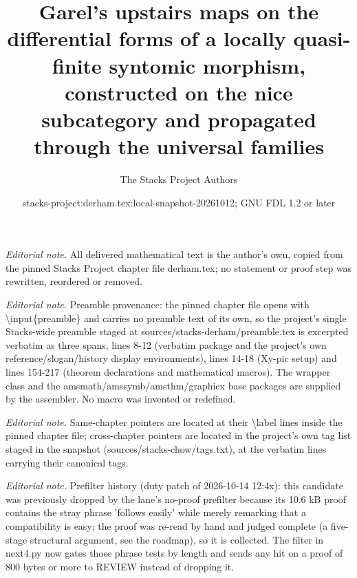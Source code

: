 \documentclass[10pt,a4paper]{amsart}
\title{Garel's upstairs maps on the differential forms of a locally quasi-finite syntomic morphism, constructed on the nice subcategory and propagated through the universal families}
\author{The Stacks Project Authors}
\date{stacks-project:derham.tex:local-snapshot-20261012; GNU FDL 1.2 or later}
\theoremstyle{plain}
\theoremstyle{definition}
\theoremstyle{remark}
\numberwithin{equation}{subsection}
\begin{document}
\maketitle
\noindent\textit{Editorial note.} All delivered mathematical text is the author's own, copied from the pinned Stacks Project chapter file derham.tex; no statement or proof step was rewritten, reordered or removed.\par\medskip
\noindent\textit{Editorial note.} Preamble provenance: the pinned chapter file opens with \textbackslash{}input\{preamble\} and carries no preamble text of its own, so the project's single Stacks-wide preamble staged at sources/stacks-derham/preamble.tex is excerpted verbatim as three spans, lines 8-12 (verbatim package and the project's own reference/slogan/history display environments), lines 14-18 (Xy-pic setup) and lines 154-217 (theorem declarations and mathematical macros). The wrapper class and the amsmath/amssymb/amsthm/graphicx base packages are supplied by the assembler. No macro was invented or redefined.\par\medskip
\noindent\textit{Editorial note.} Same-chapter pointers are located at their \textbackslash{}label lines inside the pinned chapter file; cross-chapter pointers are located in the project's own tag list staged in the snapshot (sources/stacks-chow/tags.txt), at the verbatim lines carrying their canonical tags.\par\medskip
\noindent\textit{Editorial note.} Prefilter history (duty patch of 2026-10-14 12:4x): this candidate was previously dropped by the lane's no-proof prefilter because its 10.6 kB proof contains the stray phrase 'follows easily' while merely remarking that a compatibility is easy; the proof was re-read by hand and judged complete (a five-stage structural argument, see the roadmap), so it is collected. The filter in next4.py now gates those phrase tests by length and sends any hit on a proof of 800 bytes or more to REVIEW instead of dropping it.\par\medskip
\end{document}
